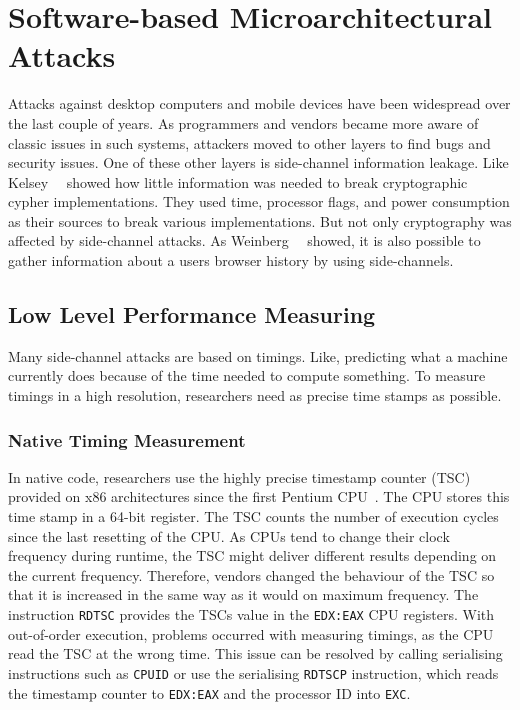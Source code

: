 \section{Software-based Microarchitectural Attacks}

Attacks against desktop computers and mobile devices have been widespread over
the last couple of years. As programmers and vendors became more aware of
classic issues in such systems, attackers moved to other layers to find bugs and
security issues. One of these other layers is side-channel information leakage.
Like Kelsey~\etal~\cite{kelsey1998side} showed how little information was needed
to break cryptographic cypher implementations. They used time, processor flags,
and power consumption as their sources to break various implementations. But not
only cryptography was affected by side-channel attacks. As
Weinberg~\etal~\cite{weinberg2011still} showed, it is also possible to gather
information about a users browser history by using side-channels.

\subsection{Low Level Performance Measuring}

Many side-channel attacks are based on timings. Like, predicting what a machine
currently does because of the time needed to compute something. To measure
timings in a high resolution, researchers need as precise time stamps as
possible.

\subsubsection{Native Timing Measurement}

In native code, researchers use the highly precise timestamp counter (TSC)
provided on x86 architectures since the first Pentium CPU~\cite{intelsys}. The
CPU stores this time stamp in a 64-bit register. The TSC counts the number of
execution cycles since the last resetting of the CPU. As CPUs tend to change
their clock frequency during runtime, the TSC might deliver different results
depending on the current frequency. Therefore, vendors changed the behaviour of
the TSC so that it is increased in the same way as it would on maximum
frequency. The instruction \texttt{RDTSC} provides the TSC\textquotesingle s
value in the
\texttt{EDX:EAX} CPU registers. With out-of-order execution, problems occurred
with measuring timings, as the CPU read the TSC at the wrong time. This issue
can be resolved by calling serialising instructions such as \texttt{CPUID} or
use the serialising \texttt{RDTSCP} instruction, which reads the timestamp
counter to \texttt{EDX:EAX} and the processor ID into \texttt{EXC}.

